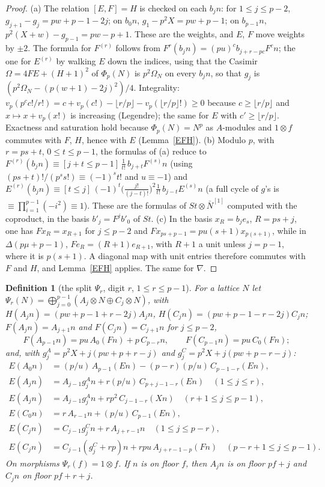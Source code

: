 \documentclass[10pt]{article}
\theoremstyle{ds}
\newtheorem{definition}[lemma]{Definition}
\theoremstyle{dsrem}
\begin{document}
\begin{proof}
(a) The relation $[E,F]=H$ is checked on each $b_jn$: for $1\le j\le p-2$, $g_{j+1}-g_j=pw+p-1-2j$; on $b_0n$, $g_1-p^2X=pw+p-1$; on $b_{p-1}n$, $p^2(X+w)-g_{p-1}=pw-p+1$. These are the weights, and $E$, $F$ move weights by $\pm2$. The formula for $F^{(r)}$ follows from $F^r(b_jn)=(pu)^cb_{j+r-pc}F^cn$; the one for $E^{(r)}$ by walking $E$ down the indices, using that the Casimir $\Omega=4FE+(H+1)^2$ of $\Phi_p(N)$ is $p^2\Omega_N$ on every $b_jn$, so that $g_j$ is $(p^2\Omega_N-(p(w+1)-2j)^2)/4$. Integrality: $v_p(p^cc!/r!)=c+v_p(c!)-\lfloor r/p\rfloor-v_p(\lfloor r/p\rfloor!)\ge0$ because $c\ge\lfloor r/p\rfloor$ and $x\mapsto x+v_p(x!)$ is increasing (Legendre); the same for $E$ with $c'\ge\lfloor r/p\rfloor$. Exactness and saturation hold because $\Phi_p(N)=N^p$ as $A$-modules and $1\otimes f$ commutes with $F$, $H$, hence with $E$ (Lemma~\ref{EFH}).
(b) Modulo $p$, with $r=ps+t$, $0\le t\le p-1$, the formulas of (a) reduce to $F^{(r)}(b_jn)\equiv[j+t\le p-1]\,\frac1{t!}\,b_{j+t}F^{(s)}n$ (using $(ps+t)!/(p^ss!)\equiv(-1)^st!$ and $u\equiv-1$) and $E^{(r)}(b_jn)\equiv[t\le j]\,(-1)^t\big(\frac{j!}{(j-t)!}\big)^2\frac1{t!}\,b_{j-t}E^{(s)}n$ (a full cycle of $g$'s is $\equiv\prod_{i=1}^{p-1}(-i^2)\equiv1$). These are the formulas of $St\otimes\bar N^{[1]}$ computed with the coproduct, in the basis $b'_j=F^jb'_0$ of $St$.
(c) In the basis $x_R=b_je_s$, $R=ps+j$, one has $Fx_R=x_{R+1}$ for $j\le p-2$ and $Fx_{ps+p-1}=pu(s+1)x_{p(s+1)}$, while in $\Delta(p\mu+p-1)$, $Fe_R=(R+1)e_{R+1}$, with $R+1$ a unit unless $j=p-1$, where it is $p(s+1)$. A diagonal map with unit entries therefore commutes with $F$ and $H$, and Lemma~\ref{EFH} applies. The same for $\nabla$.
\end{proof}

\begin{definition}[the split $\Psi_r$, digit $r$, $1\le r\le p-1$]\label{defPsi}
For a lattice $N$ let $\Psi_r(N)=\bigoplus_{j=0}^{p-1}(A_j\otimes N\oplus C_j\otimes N)$, with $H(A_jn)=(pw+p-1+r-2j)A_jn$, $H(C_jn)=(pw+p-1-r-2j)C_jn$; $F(A_jn)=A_{j+1}n$ and $F(C_jn)=C_{j+1}n$ for $j\le p-2$,
\[
F(A_{p-1}n)=pu\,A_0(Fn)+p\,C_{p-r}n,\qquad F(C_{p-1}n)=pu\,C_0(Fn);
\]
and, with $g^A_j=p^2X+j(pw+p+r-j)$ and $g^C_j=p^2X+j(pw+p-r-j)$:
\begin{align*}
E(A_0n)&=(p/u)\,A_{p-1}(En)-(p-r)(p/u)\,C_{p-1-r}(En),\\
E(A_jn)&=A_{j-1}g^A_jn+r(p/u)\,C_{p+j-1-r}(En)\quad(1\le j\le r),\\
E(A_jn)&=A_{j-1}g^A_jn+rp^2\,C_{j-1-r}(Xn)\quad(r+1\le j\le p-1),\\
E(C_0n)&=r\,A_{r-1}n+(p/u)\,C_{p-1}(En),\\
E(C_jn)&=C_{j-1}g^C_jn+r\,A_{j+r-1}n\quad(1\le j\le p-r),\\
E(C_jn)&=C_{j-1}(g^C_j+rp)n+rpu\,A_{j+r-1-p}(Fn)\quad(p-r+1\le j\le p-1).
\end{align*}
On morphisms $\Psi_r(f)=1\otimes f$. If $n$ is on floor $f$, then $A_jn$ is on floor $pf+j$ and $C_jn$ on floor $pf+r+j$.
\end{definition}
\end{document}
